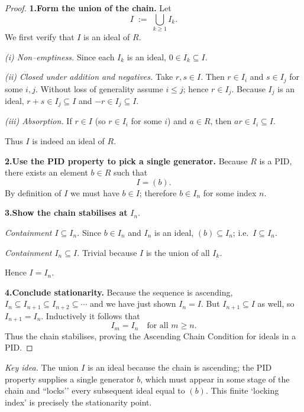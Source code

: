 \documentclass[12pt]{article}
\theoremstyle{definition} %
\theoremstyle{plain} %
\begin{document}
  \begin{proof}
  \textbf{1.\;Form the union of the chain.}\;
  Let
  \[
     I \;:=\; \bigcup_{k\ge1} I_{k}.
  \]
  We first verify that \(I\) is an ideal of \(R\).
  
  \smallskip
  \emph{(i) Non–emptiness.}\;
  Since each \(I_k\) is an ideal, \(0\in I_k\subseteq I\).
  
  \emph{(ii) Closed under addition and negatives.}\;
  Take \(r,s\in I\).  Then \(r\in I_i\) and \(s\in I_j\) for some \(i,j\).
  Without loss of generality assume \(i\le j\); hence \(r\in I_j\).
  Because \(I_j\) is an ideal, \(r+s\in I_j\subseteq I\) and \(-r\in I_j\subseteq I\).
  
  \emph{(iii) Absorption.}\;
  If \(r\in I\) (so \(r\in I_i\) for some \(i\)) and \(a\in R\),
  then \(ar\in I_i\subseteq I\).
  
  Thus \(I\) is indeed an ideal of \(R\).
  
  \bigskip
  \textbf{2.\;Use the PID property to pick a single generator.}\;
  Because \(R\) is a PID, there exists an element \(b\in R\) such that
  \[
       I = (b).
  \]
  By definition of \(I\) we must have \(b\in I\); therefore \(b\in I_n\)
  for some index \(n\).
  
  \bigskip
  \textbf{3.\;Show the chain stabilises at } \(I_n\).
  
  \emph{Containment \(I\subseteq I_n\).}\;
  Since \(b\in I_n\) and \(I_n\) is an ideal,
  \((b)\subseteq I_n\); i.e.\ \(I\subseteq I_n\).
  
  \emph{Containment \(I_n\subseteq I\).}\;
  Trivial because \(I\) is the union of all \(I_k\).
  
  Hence \(I=I_n\).
  
  \bigskip
  \textbf{4.\;Conclude stationarity.}\;
  Because the sequence is ascending,
  \(
     I_n \subseteq I_{n+1} \subseteq I_{n+2}\subseteq\cdots
  \)
  and we have just shown \(I_{n}=I\).
  But \(I_{n+1}\subseteq I\) as well, so \(I_{n+1}=I_{n}\).
  Inductively it follows that
  \[
     I_{m}=I_{n}\quad\text{for all } m\ge n.
  \]
  Thus the chain stabilises, proving the Ascending Chain Condition for ideals in a PID.
  \end{proof}
  
  \bigskip
  \noindent\emph{Key idea.}\;
  The union \(I\) is an ideal because the chain is ascending;  
  the PID property supplies a single generator \(b\), which must appear in
  some stage of the chain and “locks’’ every subsequent ideal equal to
  \((b)\).  This finite ‘locking index’ is precisely the stationarity point.
\end{document}
